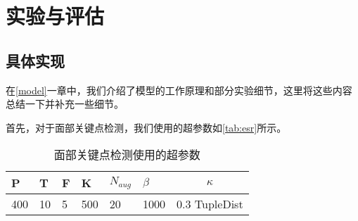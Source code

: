 \section{实验与评估}
\label{evaluation}

\subsection{具体实现}

在\ref{model}一章中，我们介绍了模型的工作原理和部分实验细节，这里将这些内容总结一下并补充一些细节。

首先，对于面部关键点检测，我们使用的超参数如\ref{tab:esr}所示。

\begin{table}[h]
	\begin{tabularx}{\textwidth}{|X|X|X|X|X|X|c|}
		\hline
		P& T & F &  K& $N_{aug}$& $\beta$& $\kappa$\\ 
		\hline 
		400& 10 & 5  & 500 & 20 & 1000& 0.3 TupleDist\\ 
		\hline
	\end{tabularx} 
	\caption{面部关键点检测使用的超参数}
\end{table}
